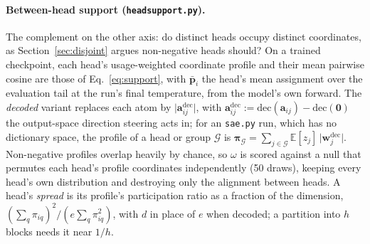 \paragraph{Between-head support (\texttt{headsupport.py}).}
The complement on the other axis: do distinct heads occupy distinct
coordinates, as Section~\ref{sec:disjoint} argues non-negative heads
should? On a trained checkpoint, each head's usage-weighted coordinate
profile and their mean pairwise cosine are those of
Eq.~\eqref{eq:support}, with $\bar{\mathbf{p}}_i$ the head's mean
assignment over the evaluation tail at the run's final temperature, from
the model's own forward. The \emph{decoded} variant replaces each atom by
$\lvert\mathbf{a}^{\mathrm{dec}}_{ij}\rvert$, with
$\mathbf{a}^{\mathrm{dec}}_{ij} := \mathrm{dec}(\mathbf{a}_{ij}) -
\mathrm{dec}(\mathbf{0})$ the output-space direction steering acts in; for
an \texttt{sae.py} run, which has no dictionary space, the profile of a
head or group $\mathcal{G}$ is
$\boldsymbol{\pi}_{\mathcal{G}} = \sum_{j \in \mathcal{G}} \mathbb{E}[z_j]\,\lvert
\mathbf{w}^{\mathrm{dec}}_j\rvert$. Non-negative profiles overlap heavily
by chance, so $\omega$ is scored against a null that permutes each head's
profile coordinates independently (50 draws), keeping every head's own
distribution and destroying only the alignment between heads. A head's
\emph{spread} is its profile's participation ratio as a fraction of the
dimension, $(\sum_q \pi_{iq})^2 / (e \sum_q \pi_{iq}^2)$, with $d$ in
place of $e$ when decoded; a partition into $h$ blocks needs it near
$1/h$.

